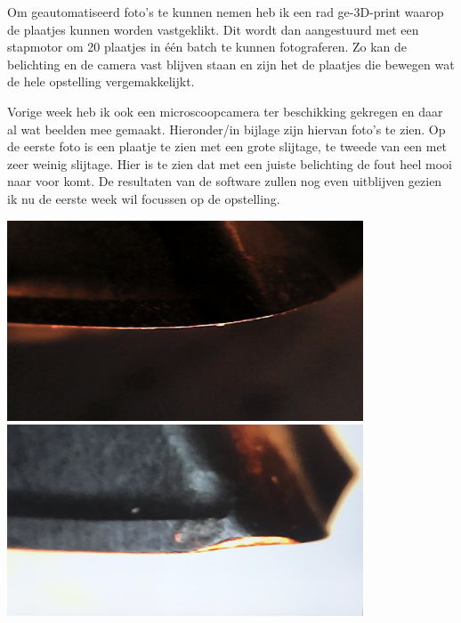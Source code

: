 \documentclass{article}
\begin{document}
Om geautomatiseerd foto’s te kunnen nemen heb ik een rad ge-3D-print waarop de plaatjes kunnen worden vastgeklikt. Dit wordt dan aangestuurd met een stapmotor om 20 plaatjes in één batch te kunnen fotograferen. Zo kan de belichting en de camera vast blijven staan en zijn het de plaatjes die bewegen wat de hele opstelling vergemakkelijkt.

 

Vorige week heb ik ook een microscoopcamera ter beschikking gekregen en daar al wat beelden mee gemaakt. Hieronder/in bijlage zijn hiervan foto’s te zien. Op de eerste foto is een plaatje te zien met een grote slijtage, te tweede van een met zeer weinig slijtage. Hier is te zien dat met een juiste belichting de fout heel mooi naar voor komt. De resultaten van de software zullen nog even uitblijven gezien ik nu de eerste week wil focussen op de opstelling.



\includegraphics[width=4.166667in, keepaspectratio=true]{./ZimFiles_files/Verslagen/Activiteiten_rapport/Activities/Masterproef_Tool_Wear_Inspection_-_Update_3_TJ/eerste-opstelling_donkere_achtergrond3.jpg}\includegraphics[width=4.166667in, keepaspectratio=true]{./ZimFiles_files/Verslagen/Activiteiten_rapport/Activities/Masterproef_Tool_Wear_Inspection_-_Update_3_TJ/eerste_setup_andere_richting_beeld2_screen image.jpeg}

 
\end{document}
